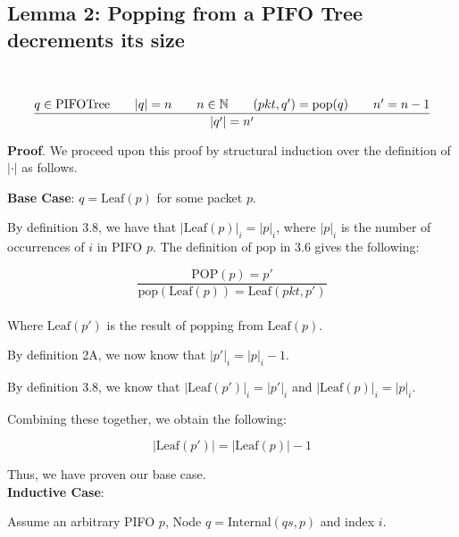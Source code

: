 \documentclass{article}
\begin{document}
\subsection{Lemma 2: Popping from a PIFO Tree decrements its size}

\par\

$$\frac{q \in \text{PIFOTree} \hspace{0.7cm} |q| = n \hspace{0.7cm} n \in \mathbb{N} \hspace{0.7cm} (pkt, q') = \text{pop}(q) \hspace{0.7cm} n' = n-1}{|q'| = n'}$$

\noindent \textbf{Proof}. We proceed upon this proof by structural induction over the definition of $|\cdot|$ as follows.\newline

\noindent \textbf{Base Case}: $q = \text{Leaf}(p)$ for some packet $p$.\newline

\noindent By definition 3.8, we have that $|\text{Leaf}(p)|_i = |p|_i$, where $|p|_i$ is the number of occurrences of $i$ in PIFO $p$. The definition of $\text{pop}$ in 3.6 gives the following:

$$\frac{\text{POP}(p) = p'}{\text{pop}(\text{Leaf}(p)) = \text{Leaf}(pkt, p')}$$\\[-10pt]

\noindent Where $\text{Leaf}(p')$ is the result of $\text{pop}$ping from $\text{Leaf}(p)$.\newline

\noindent By definition 2A, we now know that $|p'|_i = |p|_i - 1$.\newline

\noindent By definition 3.8, we know that $|\text{Leaf}(p')|_i = |p'|_i$ and $|\text{Leaf}(p)|_i = |p|_i$.\newline

\noindent Combining these together, we obtain the following:

$$|\text{Leaf}(p')| = |\text{Leaf}(p)| - 1$$

\noindent Thus, we have proven our base case.\\[10pt]

\noindent \textbf{Inductive Case}:\newline

\noindent Assume an arbitrary PIFO $p$, Node $q = \text{Internal}(qs, p)$ and index $i$.\newline
\end{document}
